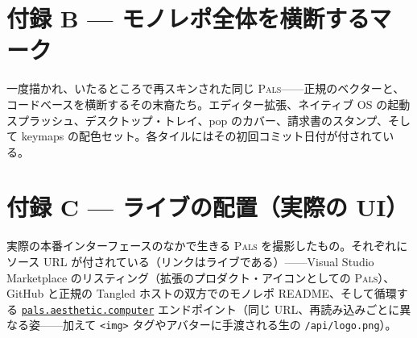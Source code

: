 \documentclass[10pt,letterpaper,twocolumn]{article}
\newcommand{\pals}{\textsc{Pals}}
\begin{document}



\newpage
\section*{付録 B — モノレポ全体を横断するマーク}
\noindent 一度描かれ、いたるところで再スキンされた同じ \pals{}——正規のベクターと、コードベースを横断するその末裔たち。エディター拡張、ネイティブ OS の起動スプラッシュ、デスクトップ・トレイ、pop のカバー、請求書のスタンプ、そして keymaps の配色セット。各タイルにはその初回コミット日付が付されている。
\vspace{1.2em}



\newpage
\section*{付録 C — ライブの配置（実際の UI）}
\noindent 実際の本番インターフェースのなかで生きる \pals{} を撮影したもの。それぞれにソース URL が付されている（リンクはライブである）——Visual Studio Marketplace のリスティング（拡張のプロダクト・アイコンとしての \pals{}）、GitHub と正規の Tangled ホストの双方でのモノレポ README、そして循環する \href{https://pals.aesthetic.computer}{\texttt{pals.aesthetic.computer}} エンドポイント（同じ URL、再読み込みごとに異なる姿——加えて \texttt{<img>} タグやアバターに手渡される生の \texttt{/api/logo.png}）。
\vspace{1.0em}


\end{document}
